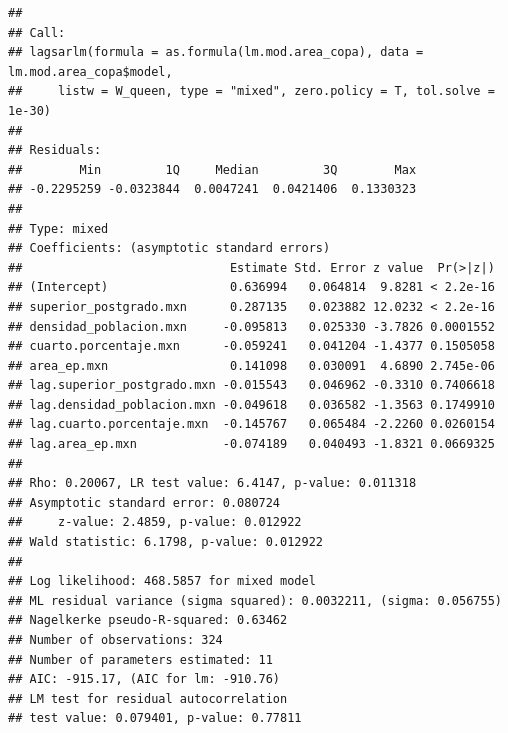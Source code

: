 \documentclass[12pt,]{book}
\newenvironment{Shaded}{\begin{snugshade}}{\end{snugshade}}
\newcommand{\KeywordTok}[1]{\textcolor[rgb]{0.13,0.29,0.53}{\textbf{#1}}}
\newcommand{\DataTypeTok}[1]{\textcolor[rgb]{0.13,0.29,0.53}{#1}}
\newcommand{\StringTok}[1]{\textcolor[rgb]{0.31,0.60,0.02}{#1}}
\newcommand{\CommentTok}[1]{\textcolor[rgb]{0.56,0.35,0.01}{\textit{#1}}}
\newcommand{\OperatorTok}[1]{\textcolor[rgb]{0.81,0.36,0.00}{\textbf{#1}}}
\newcommand{\NormalTok}[1]{#1}
\begin{document}
\begin{verbatim}
## 
## Call:
## lagsarlm(formula = as.formula(lm.mod.area_copa), data = lm.mod.area_copa$model, 
##     listw = W_queen, type = "mixed", zero.policy = T, tol.solve = 1e-30)
## 
## Residuals:
##        Min         1Q     Median         3Q        Max 
## -0.2295259 -0.0323844  0.0047241  0.0421406  0.1330323 
## 
## Type: mixed 
## Coefficients: (asymptotic standard errors) 
##                             Estimate Std. Error z value  Pr(>|z|)
## (Intercept)                 0.636994   0.064814  9.8281 < 2.2e-16
## superior_postgrado.mxn      0.287135   0.023882 12.0232 < 2.2e-16
## densidad_poblacion.mxn     -0.095813   0.025330 -3.7826 0.0001552
## cuarto.porcentaje.mxn      -0.059241   0.041204 -1.4377 0.1505058
## area_ep.mxn                 0.141098   0.030091  4.6890 2.745e-06
## lag.superior_postgrado.mxn -0.015543   0.046962 -0.3310 0.7406618
## lag.densidad_poblacion.mxn -0.049618   0.036582 -1.3563 0.1749910
## lag.cuarto.porcentaje.mxn  -0.145767   0.065484 -2.2260 0.0260154
## lag.area_ep.mxn            -0.074189   0.040493 -1.8321 0.0669325
## 
## Rho: 0.20067, LR test value: 6.4147, p-value: 0.011318
## Asymptotic standard error: 0.080724
##     z-value: 2.4859, p-value: 0.012922
## Wald statistic: 6.1798, p-value: 0.012922
## 
## Log likelihood: 468.5857 for mixed model
## ML residual variance (sigma squared): 0.0032211, (sigma: 0.056755)
## Nagelkerke pseudo-R-squared: 0.63462 
## Number of observations: 324 
## Number of parameters estimated: 11 
## AIC: -915.17, (AIC for lm: -910.76)
## LM test for residual autocorrelation
## test value: 0.079401, p-value: 0.77811
\end{verbatim}

\begin{Shaded}
\end{Shaded}
\end{document}
